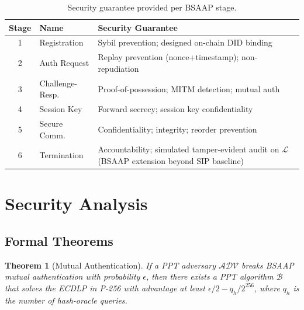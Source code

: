 \documentclass[review,5p,twocolumn,times]{elsarticle}
\newtheorem{theorem}{Theorem}[section]
\begin{document}
\begin{table}[H]
\centering
\caption{Security guarantee provided per BSAAP stage.}
\label{tab:stageguarantees}
\small
\begin{tabular}{@{}clp{4.0cm}@{}}
\toprule
\textbf{Stage} & \textbf{Name} & \textbf{Security Guarantee}\\
\midrule
1 & Registration    & Sybil prevention; designed on-chain DID binding\\
2 & Auth Request    & Replay prevention (nonce+timestamp); non-repudiation\\
3 & Challenge-Resp. & Proof-of-possession; MITM detection; mutual auth\\
4 & Session Key     & Forward secrecy; session key confidentiality\\
5 & Secure Comm.    & Confidentiality; integrity; reorder prevention\\
6 & Termination     & Accountability; simulated tamper-evident audit on $\mathcal{L}$ (BSAAP extension beyond SIP baseline)\\
\bottomrule
\end{tabular}
\end{table}

\section{Security Analysis}\label{sec:security}

\subsection{Formal Theorems}

\begin{theorem}[Mutual Authentication]\label{thm:auth}
If a PPT adversary $\mathcal{ADV}$ breaks BSAAP mutual authentication with
probability $\epsilon$, then there exists a PPT algorithm $\mathcal{B}$ that
solves the ECDLP in P-256 with advantage at least $\epsilon/2 - q_h/2^{256}$,
where $q_h$ is the number of hash-oracle queries.
\end{theorem}
\end{document}
